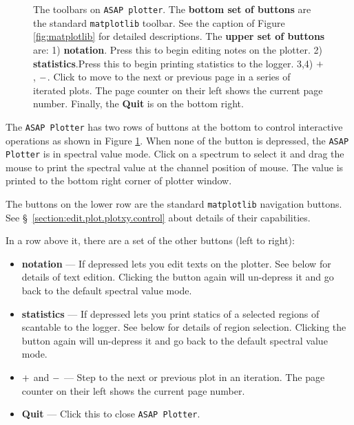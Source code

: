 \begin{figure}[h!]
\begin{center}
\caption{\label{fig:sdplot_toolbar}
  The toolbars on {\tt ASAP plotter}.
  The {\bf bottom set of buttons} are the standard {\tt matplotlib} toolbar. 
  See the caption of Figure \ref{fig:matplotlib} for detailed descriptions.
  The {\bf upper set of buttons} are:
  1) {\bf notation}. Press this to begin editing notes on the plotter. 
  2) {\bf statistics}.Press this to begin printing statistics to the logger.
  3,4) $ {\bf +} $, $ {\bf -} $. Click to move to the next or previous page in a series 
  of iterated plots. The page counter on their left shows the current page 
  number. Finally, the {\bf Quit} is on the bottom right.}
\hrulefill
\end{center}
\end{figure}

The {\tt ASAP Plotter} has two rows of buttons at the bottom to 
control interactive operations as shown in Figure \ref{fig:sdplot_toolbar}. 
When none of the button is depressed, the {\tt ASAP Plotter} is in spectral 
value mode. Click on a spectrum to select it and drag the mouse to print 
the spectral value at the channel position of mouse. The value is printed 
to the bottom right corner of plotter window.

The buttons on the lower row are the standard 
{\tt matplotlib} navigation buttons. 
See \S~\ref{section:edit.plot.plotxy.control} about details of their 
capabilities.

In a row above it, there are a set of the other buttons (left to right):
\begin{itemize}
\item {\bf notation} --- If depressed lets you edit texts on the plotter. 
  See below for details of text edition.
  Clicking the button again will un-depress it and go back 
  to the default spectral value mode.
\item {\bf statistics} --- If depressed lets you print statics of a 
  selected regions of scantable to the logger.
  See below for details of region selection.
  Clicking the button again will un-depress it and go back 
  to the default spectral value mode.
\item $ {\bf +} $ and $ {\bf -} $ --- Step to the next or previous plot 
  in an iteration. The page counter on their left shows the current page
  number.
\item {\bf Quit} --- Click this to close {\tt ASAP Plotter}.
\end {itemize}

